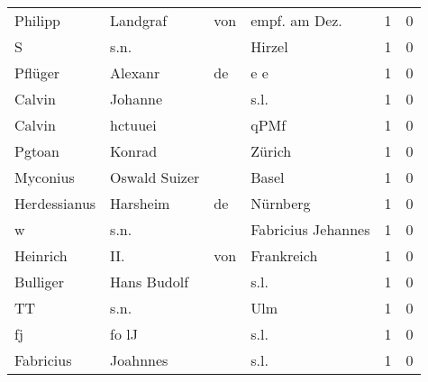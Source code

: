 \begin{center}
\begin{tiny}
\begin{longtabu}{llllrr}
                  Philipp &                           Landgraf &         von &                              empf. am Dez.  &          1 &         0 \\
                        S &                               s.n. &             &                                      Hirzel &          1 &         0 \\
                  Pflüger &                            Alexanr &          de &                                         e e &          1 &         0 \\
                   Calvin &                            Johanne &             &                                        s.l. &          1 &         0 \\
                   Calvin &                            hctuuei &             &                                        qPMf &          1 &         0 \\
                   Pgtoan &                             Konrad &             &                                      Zürich &          1 &         0 \\
                 Myconius &                      Oswald Suizer &             &                                       Basel &          1 &         0 \\
             Herdessianus &                           Harsheim &          de &                                    Nürnberg &          1 &         0 \\
                        w &                               s.n. &             &                          Fabricius Jehannes &          1 &         0 \\
                 Heinrich &                                II. &         von &                                  Frankreich &          1 &         0 \\
                 Bulliger &                        Hans Budolf &             &                                        s.l. &          1 &         0 \\
                       TT &                               s.n. &             &                                         Ulm &          1 &         0 \\
                       fj &                              fo lJ &             &                                        s.l. &          1 &         0 \\
                Fabricius &                           Joahnnes &             &                                        s.l. &          1 &         0 \\

\end{longtabu}
\end{tiny}
\end{center}
